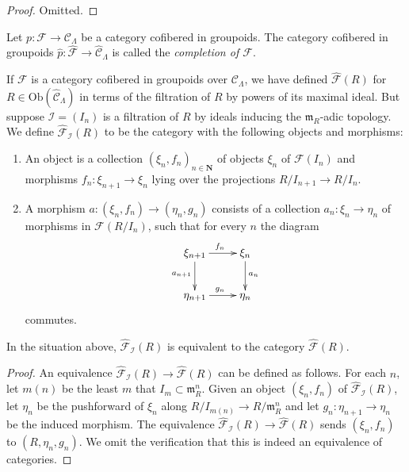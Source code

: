 \begin{proof}
Omitted.
\end{proof}

\begin{definition}
\label{definition-completion}
Let $p: \mathcal{F} \to \mathcal{C}_\Lambda$ be a category cofibered in 
groupoids.  The category cofibered in groupoids $\widehat{p}: \widehat{\mathcal 
F} \to \widehat{\mathcal{C}}_\Lambda$ is called the
{\it completion of $\mathcal{F}$}.
\end{definition}

\noindent
If $\mathcal{F}$ is a category cofibered in groupoids over $\mathcal 
C_\Lambda$, we have defined $\widehat{\mathcal{F}}(R)$ for $R \in 
\text{Ob}(\widehat{\mathcal{C}}_\Lambda)$ in terms of the filtration of 
$R$ by powers of its maximal ideal.  But suppose $\mathcal I = (I_{n})$ is a 
filtration of $R$ by ideals inducing the $\mathfrak{m}_{R}$-adic topology.  We 
define $\widehat{\mathcal{F}}_{\mathcal I}(R)$ to be the category with the 
following objects and morphisms:
\begin{enumerate}
\item An object is a collection $(\xi_{n}, f_{n})_{n \in \mathbf{N}}$ of 
objects $\xi_{n}$ of $\mathcal{F}(I_{n})$ and morphisms $f_{n}: \xi_{n+1} 
\to \xi_{n}$ lying over the projections $R/I_{n+1} \to R/I_{n}$.
\item A morphism $a: (\xi_n,f_n) \to (\eta_n, g_n)$ consists of a 
collection $a_n: \xi_n \to \eta_n$ of morphisms in $\mathcal 
F(R/I_{n})$, such that for every $n$ the diagram
\[
\xymatrix{
\xi_{n+1} \ar[r]^{f_{n}} \ar[d]_{a_{n+1}} & \xi_{n} \ar[d]^{a_{n}} \\
\eta_{n+1} \ar[r]^{g_{n}} & \eta_{n} 
}
\]
commutes.
\end{enumerate}

\begin{lemma}
\label{lemma-formal-objects-different-filtration}
In the situation above, $\widehat{\mathcal{F}}_{\mathcal I}(R)$ is equivalent 
to the category $\widehat{\mathcal{F}}(R)$.
\end{lemma}

\begin{proof}
An equivalence $\widehat{\mathcal{F}}_{\mathcal I}(R) \to 
\widehat{\mathcal{F}}(R)$ can be defined as follows.  For each $n$, let $m(n)$ 
be the least $m$ that $I_{m} \subset \mathfrak{m}_{R}^{n}$.  Given an object 
$(\xi_n,f_n)$ of $\widehat{\mathcal{F}}_{\mathcal I}(R)$, let $\eta_{n}$ be the 
pushforward of $\xi_{n}$ along $R/I_{m(n)} \to R/\mathfrak{m}_{R}^{n}$ 
and let $g_{n}: \eta_{n+1} \to \eta_{n}$ be the induced morphism.  The 
equivalence $\widehat{\mathcal{F}}_{\mathcal I}(R) \to 
\widehat{\mathcal{F}}(R)$ sends $(\xi_n,f_n)$ to $(R,\eta_n,g_n)$.  We omit the 
verification that this is indeed an equivalence of categories.
\end{proof}

